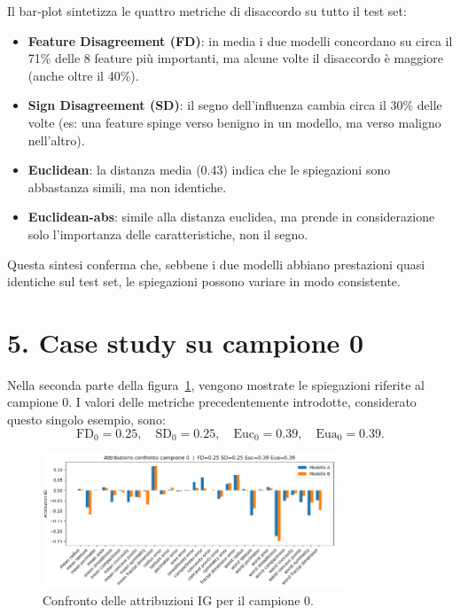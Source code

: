 \documentclass[a4paper,11pt]{article}
\begin{document}
Il bar‐plot sintetizza le quattro metriche di disaccordo su tutto il test set:
\begin{itemize}
    \item \textbf{Feature Disagreement (FD)}: in media i due modelli concordano su circa il 71\% delle 8 feature più importanti, ma alcune volte il disaccordo è maggiore (anche oltre il 40\%).
    \item \textbf{Sign Disagreement (SD)}: il segno dell'influenza cambia circa il 30\% delle volte (es: una feature spinge verso benigno in un modello, ma verso maligno nell’altro).
    \item \textbf{Euclidean}: la distanza media (0.43) indica che le spiegazioni sono abbastanza simili, ma non identiche.
    \item \textbf{Euclidean-abs}: simile alla distanza euclidea, ma prende in considerazione solo l'importanza delle caratteristiche, non il segno.
\end{itemize}

Questa sintesi conferma che, sebbene i due modelli abbiano prestazioni quasi identiche sul test set, le spiegazioni possono variare in modo consistente.


\section*{5. Case study su campione 0}
Nella seconda parte della figura~\ref{fig:global_vs_case}, vengono mostrate le spiegazioni riferite al campione 0. I valori delle metriche precedentemente introdotte, considerato questo singolo esempio, sono:
\[
\text{FD}_0 = 0.25,\quad
\text{SD}_0 = 0.25,\quad
\text{Euc}_0 = 0.39,\quad
\text{Eua}_0 = 0.39.
\]

\begin{figure}[htbp]
  \centering
  \includegraphics[width=0.8\textwidth]{campione zero.png}
  \caption{Confronto delle attribuzioni IG per il campione 0.}
  \label{fig:global_vs_case}
\end{figure}
\end{document}
